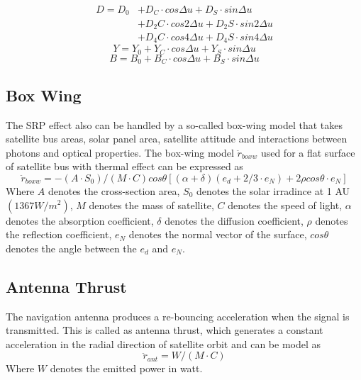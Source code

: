 \begin{equation}
\begin{split}
D = D_0 &+ D_C  \cdot cos  \Delta u + D_S  \cdot sin  \Delta u \\
        &+ D_2C \cdot cos 2\Delta u + D_2S \cdot sin 2\Delta u \\
        &+ D_4C \cdot cos 4\Delta u + D_4S \cdot sin 4\Delta u 
\end{split}
\end{equation}
\begin{equation}
Y = Y_0 + Y_C \cdot cos \Delta u + Y_S \cdot sin \Delta u
\end{equation}
\begin{equation}
B = B_0 + B_C \cdot cos \Delta u + B_S \cdot sin \Delta u
\end{equation}


\subsection{Box Wing}
The SRP effect also can be handled by a so-called box-wing model that takes satellite bus areas, solar panel area, satellite attitude and interactions between photons and optical properties. The box-wing model $\ddot{r}_{boxw}$ used for a flat surface of satellite bus with thermal effect can be expressed as
\begin{equation}
\ddot{r}_{boxw} = -(A \cdot S_0)/(M \cdot C) cos \theta  
                   [(\alpha + \delta)(e_d+2/3 \cdot e_N) + 2\rho cos \theta \cdot e_N]  
\end{equation}
Where 
$A$ denotes the cross-section area,
$S_{0}$ denotes the solar irradince at 1 AU $(1367W/m^2)$, 
$M$ denotes the mass of satellite,
$C$ denotes the speed of light,
$\alpha$ denotes the absorption coefficient,
$\delta$ denotes the diffusion coefficient,
$\rho$ denotes the reflection coefficient,
$e_N$ denotes the normal vector of the surface,
$cos \theta$ denotes the angle between the $e_d$ and $e_N$. 


\subsection{Antenna Thrust}
The navigation antenna produces a re-bouncing acceleration when the signal is transmitted. This is called as antenna thrust, which generates a constant acceleration in the radial direction of satellite orbit and can be model as 
\begin{equation}
\ddot{r}_{ant} = W/(M \cdot C)   
\end{equation}
Where 
$W$ denotes the emitted power in watt.


